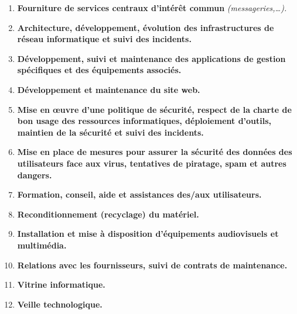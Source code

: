 \documentclass[10pt,a4paper,oneside,titlepage]{report}
\newcommand{\titre}[1]{\textcolor{title}{#1}}
\newcommand{\strong}[1]{\textbf{\titre{#1}}}
\begin{document}
\begin{enumerate}
\item \strong{Fourniture de services centraux d'intérêt commun}
\textit{(messageries,\dots).}\\

\item \strong{Architecture, développement, évolution des infrastructures de
réseau informatique et suivi des incidents.}\\

\item \strong{Développement, suivi et maintenance des applications de gestion
spécifiques et des équipements associés.}\\

\item \strong{Développement et maintenance du site web.}\\

\item \strong{Mise en œuvre d'une politique de sécurité, respect de la charte de
bon usage des ressources informatiques, déploiement d'outils, maintien de la
sécurité et suivi des incidents.}\\

\item \strong{Mise en place de mesures pour assurer la sécurité des données des
utilisateurs face aux virus, tentatives de piratage, spam et autres dangers.} \\

\item \strong{Formation, conseil, aide et assistances des/aux utilisateurs.} \\

\item \strong{Reconditionnement (recyclage) du matériel.} \\

\item \strong{Installation et mise à disposition d'équipements audiovisuels et
multimédia.} \\

\item \strong{Relations avec les fournisseurs, suivi de contrats de maintenance.
} \\

\item \strong{Vitrine informatique.} \\

\item \strong{Veille technologique.} \\


\end{enumerate}
\end{document}
